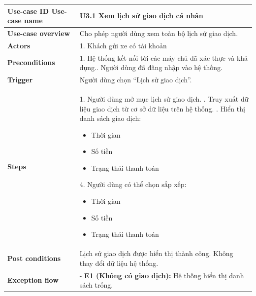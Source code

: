 \vspace{0.5cm}
\noindent
\begin{tabularx}{\textwidth}{|>{\raggedright\arraybackslash}p{4cm}|X|}
\hline
\textbf{Use-case ID} \newline \textbf{Use-case name} & U3.1 \newline \textbf{Xem lịch sử giao dịch cá nhân
} \\ \hline
\textbf{Use-case overview} & Cho phép người dùng xem toàn bộ lịch sử giao dịch. \\ \hline
\textbf{Actors} & 1. Khách gửi xe có tài khoản \\  \hline
\textbf{Preconditions} & 
1. Hệ thống kết nối tới các máy chủ đã xác thực và khả dụng.\newline
2. Người dùng đã đăng nhập vào hệ thống.\\ \hline
\textbf{Trigger} & Người dùng chọn “Lịch sử giao dịch”. \\ \hline
\textbf{Steps} & 
1. Người dùng mở mục lịch sử giao dịch. \newline
2. Truy xuất dữ liệu giao dịch từ cơ sở dữ liệu trên hệ thống. \newline
3. Hiển thị danh sách giao dịch:
\vspace*{-10pt}
\begin{itemize}
    \item Thời gian
    \vspace*{-10pt}
    \item Số tiền
    \vspace*{-10pt}
    \item Trạng thái thanh toán
\end{itemize}
\vspace*{-10pt}
4. Người dùng có thể chọn sắp xếp: 
\vspace*{-10pt}
    \begin{itemize}
        \item Thời gian
        \vspace*{-10pt}
        \item Số tiền
        \vspace*{-10pt}
        \item Trạng thái thanh toán
    \end{itemize}
\vspace*{-10pt}\\ \hline
\textbf{Post conditions} & Lịch sử giao dịch được hiển thị thành công. \newline Không thay đổi dữ liệu hệ thống.
 \\ \hline
\textbf{Exception flow} & 
- \textbf{E1 (Không có giao dịch):} Hệ thống hiển thị danh sách trống.\\ \hline
\end{tabularx}

